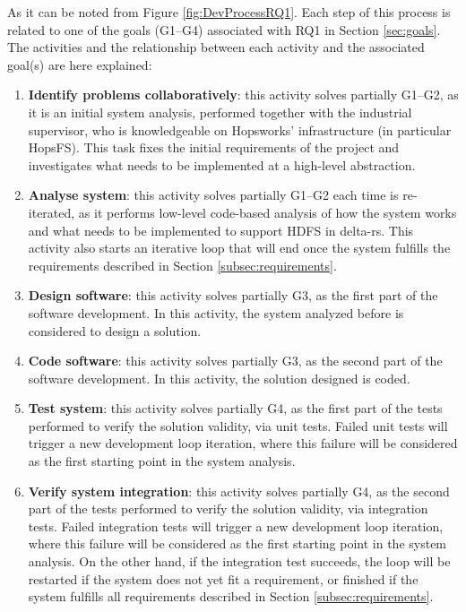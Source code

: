 As it can be noted from Figure \ref{fig:DevProcessRQ1}. Each step of this process is related to one of the goals (G1--G4) associated with RQ1 in Section \ref{sec:goals}.
The activities and the relationship between each activity and the associated goal(s) are here explained:
\begin{enumerate}
    \item \textbf{Identify problems collaboratively}: this activity solves partially G1--G2, as it is an initial system analysis, performed together with the industrial supervisor, who is knowledgeable on Hopsworks' infrastructure (in particular \gls{HopsFS}). This task fixes the initial requirements of the project and investigates what needs to be implemented at a high-level abstraction.
    \item \textbf{Analyse system}: this activity solves partially G1--G2 each time is re-iterated, as it performs low-level code-based analysis of how the system works and what needs to be implemented to support \gls{HDFS} in delta-rs. This activity also starts an iterative loop that will end once the system fulfills the requirements described in Section \ref{subsec:requirements}.
    \item \textbf{Design software}: this activity solves partially G3, as the first part of the software development. In this activity, the system analyzed before is considered to design a solution.
    \item \textbf{Code software}: this activity solves partially G3, as the second part of the software development. In this activity, the solution designed is coded.
    \item \textbf{Test system}: this activity solves partially G4, as the first part of the tests performed to verify the solution validity, via unit tests. Failed unit tests will trigger a new development loop iteration, where this failure will be considered as the first starting point in the system analysis.
    \item \textbf{Verify system integration}: this activity solves partially G4, as the second part of the tests performed to verify the solution validity, via integration tests. Failed integration tests will trigger a new development loop iteration, where this failure will be considered as the first starting point in the system analysis. On the other hand, if the integration test succeeds, the loop will be restarted if the system does not yet fit a requirement, or finished if the system fulfills all requirements described in Section \ref{subsec:requirements}.
\end{enumerate}

